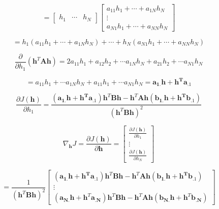 \documentclass[fleqn]{article}
\begin{document}
\begin{enumerate}
		\begin{equation*}
			= \begin{bmatrix}h_1 & \cdots & h_N\end{bmatrix}\begin{bmatrix}a_{11}h_1 + \cdots + a_{1N}h_N \\ \vdots \\ a_{N1}h_1 + \cdots + a_{NN}h_N\end{bmatrix}
		\end{equation*}
		
		\begin{equation*}
			= h_1(a_{11}h_1 + \cdots + a_{1N}h_N) + \cdots + h_N( a_{N1}h_1 + \cdots + a_{NN}h_N)
		\end{equation*}
		
		\begin{equation*}
			\frac{\partial}{\partial{h_1}}\left(\mathbf{h}^T\mathbf{A}\mathbf{h}\right) = 2a_{11}h_1 + a_{12}h_2 + \cdots a_{1N}h_N + a_{21}h_2 + \cdots a_{N1}h_N
		\end{equation*}
		
		\begin{equation*}
			= a_{11}h_1 + \cdots a_{1N}h_N + a_{11}h_1 + \cdots a_{N1}h_N = \mathbf{a_{1.}h} + \mathbf{h^Ta_{.1}}
		\end{equation*}
		
		\begin{equation*}
			\frac{\partial{J(\mathbf{h})}}{\partial{h_1}} = \frac{(\mathbf{a_{1.}h} + \mathbf{h^Ta_{.1}})\mathbf{h}^T\mathbf{B}\mathbf{h} - \mathbf{h}^T\mathbf{A}\mathbf{h}(\mathbf{b_{1.}h} + \mathbf{h^Tb_{.1}})}{(\mathbf{h}^T\mathbf{B}\mathbf{h})^2}
		\end{equation*}
		
		\begin{equation*}
			\nabla_{\mathbf{h}}{J} = \frac{\partial{J(\mathbf{h})}}{\partial\mathbf{h}} = \begin{bmatrix}
				\frac{\partial{J(\mathbf{h})}}{\partial{h_1}} \\
				\vdots \\
				\frac{\partial{J(\mathbf{h})}}{\partial{h_N}}
			\end{bmatrix}
		\end{equation*}
		
		\begin{equation*}
			 = \frac{1}{(\mathbf{h}^T\mathbf{B}\mathbf{h})^2}\begin{bmatrix}
				(\mathbf{a_{1.}h} + \mathbf{h^Ta_{.1}})\mathbf{h}^T\mathbf{B}\mathbf{h} - \mathbf{h}^T\mathbf{A}\mathbf{h}(\mathbf{b_{1.}h} + \mathbf{h^Tb_{.1}}) \\
				\vdots \\
				(\mathbf{a_{N.}h} + \mathbf{h}^T\mathbf{a_{.N}})\mathbf{h}^T\mathbf{B}\mathbf{h} - \mathbf{h}^T\mathbf{A}\mathbf{h}(\mathbf{b_{N.}h} + \mathbf{h}^T\mathbf{b_{.N}})
			\end{bmatrix}
		\end{equation*}
		

\end{enumerate}
\end{document}
